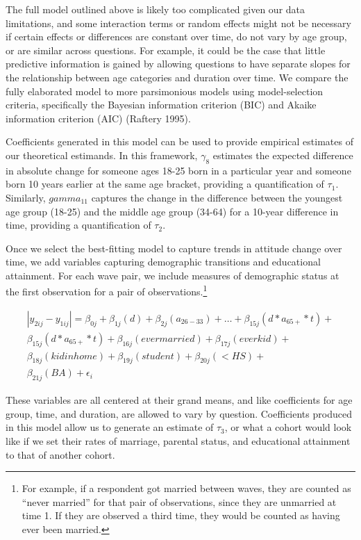 \documentclass[
  12pt,
]{article}
\begin{document}
The full model outlined above is likely too complicated given our data limitations, and some interaction terms or random effects might not be necessary if certain effects or differences are constant over time, do not vary by age group, or are similar across questions. For example, it could be the case that little predictive information is gained by allowing questions to have separate slopes for the relationship between age categories and duration over time. We compare the fully elaborated model to more parsimonious models using model-selection criteria, specifically the Bayesian information criterion (BIC) and Akaike information criterion (AIC) (Raftery 1995).

Coefficients generated in this model can be used to provide empirical estimates of our theoretical estimands. In this framework, \(\gamma_{8}\) estimates the expected difference in absolute change for someone ages 18-25 born in a particular year and someone born 10 years earlier at the same age bracket, providing a quantification of \(\tau_1\). Similarly, \(gamma_{11}\) captures the change in the difference between the youngest age group (18-25) and the middle age group (34-64) for a 10-year difference in time, providing a quantification of \(\tau_2\).

Once we select the best-fitting model to capture trends in attitude change over time, we add variables capturing demographic transitions and educational attainment. For each wave pair, we include measures of demographic status at the first observation for a pair of observations.\footnote{For example, if a respondent got married between waves, they are counted as ``never married'' for that pair of observations, since they are unmarried at time 1. If they are observed a third time, they would be counted as having ever been married.}

\begin{equation*}
 \begin{aligned}
   |y_{2ij}-y_{1ij} | = \beta_{0j} + \beta_{1j}(d) + \beta_{2j}(a_{26-33}) + … + \beta_{15j}(d*a_{65+}*t) + \\ 
   \beta_{15j}(d*a_{65+}*t) + \beta_{16j}(evermarried) + \beta_{17j}(everkid) + \\
   \beta_{18j}(kidinhome) + \beta_{19j}(student) + \beta_{20j}(<HS) + \\
   \beta_{21j}(BA) + \epsilon_i
 \end{aligned}
 \end{equation*}

These variables are all centered at their grand means, and like coefficients for age group, time, and duration, are allowed to vary by question. Coefficients produced in this model allow us to generate an estimate of \(\tau_3\), or what a cohort would look like if we set their rates of marriage, parental status, and educational attainment to that of another cohort.
\end{document}
